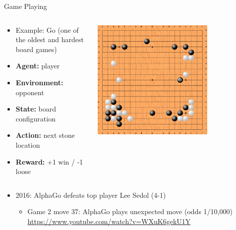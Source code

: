 \documentclass[11pt,table]{beamer}
\begin{document}
\begin{frame}{Game Playing}
    \begin{columns}[T]
\begin{column}{0.5\textwidth}
\begin{itemize}
    \item  Example: Go (one of the oldest  and hardest board games)

\item \textbf{Agent:} player
\item \textbf{Environment:} opponent
\item \textbf{State:} board configuration
\item \textbf{Action:} next stone location
\item \textbf{Reward:} +1 win / -1 loose

 
\end{itemize}
\end{column}
\begin{column}{0.45\textwidth}
\centering
\includegraphics[width=0.7\textwidth]{figures/go_game2_move_37}
\end{column}
\end{columns}

\begin{itemize}
    \item  2016: AlphaGo defeats top player Lee Sedol (4-1)
\begin{itemize}
    \item 	Game 2 move 37: AlphaGo plays unexpected move (odds 1/10,000)\\
    \url{https://www.youtube.com/watch?v=WXuK6gekU1Y}
 
\end{itemize}
\end{itemize}
\end{frame}
\end{document}
